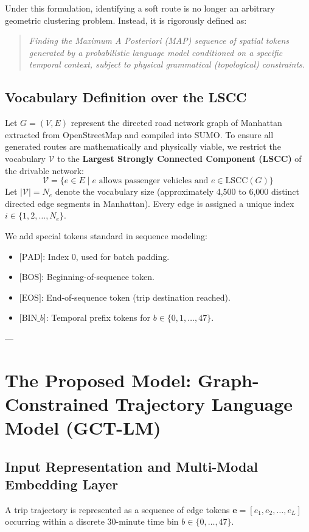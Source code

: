 \documentclass[12pt,a4paper]{article}
\begin{document}
Under this formulation, identifying a soft route is no longer an arbitrary geometric clustering problem. Instead, it is rigorously defined as:
\begin{quote}
\textit{Finding the Maximum A Posteriori (MAP) sequence of spatial tokens generated by a probabilistic language model conditioned on a specific temporal context, subject to physical grammatical (topological) constraints.}
\end{quote}

\subsection{Vocabulary Definition over the LSCC}
Let $G = (V, E)$ represent the directed road network graph of Manhattan extracted from OpenStreetMap and compiled into SUMO. To ensure all generated routes are mathematically and physically viable, we restrict the vocabulary $\mathcal{V}$ to the \textbf{Largest Strongly Connected Component (LSCC)} of the drivable network:
\begin{equation}
\mathcal{V} = \{ e \in E \mid e \text{ allows passenger vehicles and } e \in \text{LSCC}(G) \}
\end{equation}
Let $|\mathcal{V}| = N_e$ denote the vocabulary size (approximately 4,500 to 6,000 distinct directed edge segments in Manhattan). Every edge is assigned a unique index $i \in \{1, 2, \dots, N_e\}$.

We add special tokens standard in sequence modeling:
\begin{itemize}
    \item $\text{[PAD]}$: Index 0, used for batch padding.
    \item $\text{[BOS]}$: Beginning-of-sequence token.
    \item $\text{[EOS]}$: End-of-sequence token (trip destination reached).
    \item $\text{[BIN\_}b\text{]}$: Temporal prefix tokens for $b \in \{0, 1, \dots, 47\}$.
\end{itemize}

---

\section{The Proposed Model: Graph-Constrained Trajectory Language Model (GCT-LM)}

\subsection{Input Representation and Multi-Modal Embedding Layer}
A trip trajectory is represented as a sequence of edge tokens $\mathbf{e} = [e_1, e_2, \dots, e_L]$ occurring within a discrete 30-minute time bin $b \in \{0, \dots, 47\}$.
\end{document}
